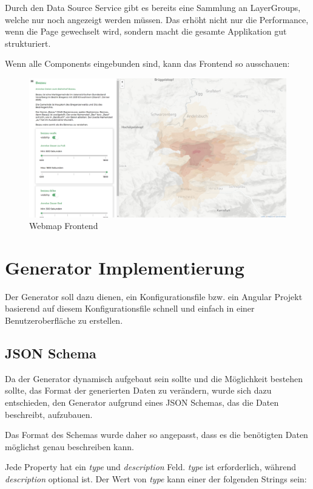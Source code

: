 Durch den Data Source Service gibt es bereits eine Sammlung an LayerGroups, welche nur noch angezeigt werden müssen.
Das erhöht nicht nur die Performance, wenn die Page gewechselt wird, sondern macht die gesamte Applikation gut strukturiert.

Wenn alle Components eingebunden sind, kann das Frontend so ausschauen:
\begin{figure}[hbt!]
    \centering
    \includegraphics[scale=.3]{pics/webmap-frontend}
    \caption{Webmap Frontend}
    \label{fig:webmap-frontend}
\end{figure}


\section{Generator Implementierung}
Der Generator soll dazu dienen, ein Konfigurationsfile bzw. ein Angular Projekt basierend auf diesem Konfigurationsfile
schnell und einfach in einer Benutzeroberfläche zu erstellen.

\subsection{JSON Schema}
Da der Generator dynamisch aufgebaut sein sollte und die Möglichkeit bestehen sollte, das Format der generierten
Daten zu verändern, wurde sich dazu entschieden, den Generator aufgrund eines JSON Schemas, das die Daten beschreibt,
aufzubauen.

Das Format des Schemas wurde daher so angepasst, dass es die benötigten Daten möglichst genau beschreiben kann.

Jede Property hat ein \textit{type} und \textit{description} Feld.
\textit{type} ist erforderlich, während \textit{description} optional ist.
Der Wert von \textit{type} kann einer der folgenden Strings sein:

